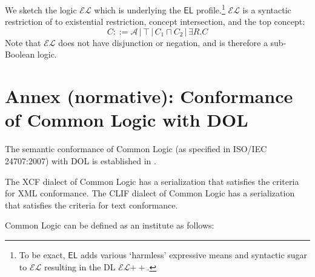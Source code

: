 \documentclass[10pt,%
\ifpretendfinal
final%
\else
draft%
\fi,
]{scrreprt}
\newcommand{\EL}{\ensuremath{\mathsf{EL}}\xspace}
\newcommand{\ELDL}{\ensuremath{\mathcal{EL}}\xspace}
\newcommand{\nisref}[1]{#1}
\newcommand{\normannex}[1]{ \chapter{Annex (normative): #1} }
\begin{document}
\begin{definition}
We sketch the logic \ELDL which is underlying the \EL profile.\footnote{To be exact, \EL adds various `harmless' expressive means and syntactic sugar to \ELDL resulting in the DL \ELDL$++$. %
} 
\ELDL is a syntactic restriction of \ALC to existential restriction, concept
intersection, and the top concept:
$$C ::= {\mathcal A} \,|\, \top \,|\,  C_1 \sqcap C_2 \,|\, \exists R . C$$
Note that \ELDL does not have disjunction or negation, and is therefore a sub-Boolean logic.
\end{definition}


\normannex{Conformance of Common Logic with DOL}\label{a:cl}

The semantic conformance of Common Logic (as specified in \nisref{ISO/IEC 24707:2007}) with DOL is established in \cite{OntoGraph}.

The XCF dialect of Common Logic has a serialization that satisfies the criteria for XML conformance.  The CLIF dialect of Common Logic has a serialization that satisfies the criteria for text conformance.

Common Logic can be defined as an institute as follows:
\end{document}
